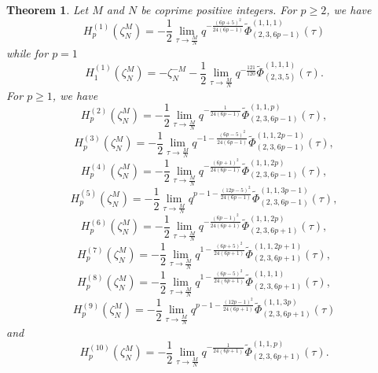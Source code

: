 \documentclass[11pt,reqno]{amsart}
\newtheorem{theorem}{Theorem}[section]
\theoremstyle{definition}
\numberwithin{equation}{section}
\renewcommand{\=}{\;=\;}
\begin{document}
\begin{theorem} \label{main} Let $M$ and $N$ be coprime positive integers. For $p \geq 2$, we have
\begin{equation} \label{main1eq}
H_p^{(1)}(\zeta_N^M) = -\frac{1}{2}  \lim_{\tau \to \frac{M}{N}} q^{-\frac{(6p+5)^2}{24(6p-1)}}\widetilde{\Phi}_{(2,3,6p-1)}^{(1,1,1)} (\tau)
\end{equation}
while for $p=1$
\begin{equation} \label{main11eq}
H_1^{(1)}(\zeta_N^M) = -\zeta_N^{-M} - \frac{1}{2}  \lim_{\tau \to \frac{M}{N}} q^{-\frac{121}{120} }\widetilde{\Phi}_{(2,3,5)}^{(1,1,1)} (\tau).
\end{equation}  
For $p \geq 1$, we have
\begin{equation} \label{main2eq}
H_p^{(2)}(\zeta_N^M) = -\frac{1}{2}  \lim_{\tau \to \frac{M}{N}} q^{-\frac{1}{24(6p-1)}} \widetilde{\Phi}_{(2,3,6p-1)}^{(1,1,p)} (\tau),
\end{equation}
\begin{equation} \label{main3eq}
H_p^{(3)}(\zeta_N^M) = -\frac{1}{2}  \lim_{\tau \to \frac{M}{N}} q^{-1 - \frac{(6p-5)^2}{24(6p-1)}} \widetilde{\Phi}_{(2,3,6p-1)}^{(1,1,2p-1)} (\tau),
\end{equation}
\begin{equation} \label{main4eq}
H_p^{(4)}(\zeta_N^M) = -\frac{1}{2}  \lim_{\tau \to \frac{M}{N}} q^{-\frac{(6p+1)^2}{24(6p-1)}} \widetilde{\Phi}_{(2,3,6p-1)}^{(1,1,2p)} (\tau),
\end{equation}
\begin{equation} \label{main5eq}
H_p^{(5)}(\zeta_N^M) = -\frac{1}{2}  \lim_{\tau \to \frac{M}{N}} q^{p-1 - \frac{(12p-5)^2}{24(6p-1)}} \widetilde{\Phi}_{(2,3,6p-1)}^{(1,1,3p-1)} (\tau),
\end{equation}
\begin{equation} \label{main6}
H_p^{(6)}(\zeta_N^M) = -\frac{1}{2}  \lim_{\tau \to \frac{M}{N}} q^{-\frac{(6p-1)^2}{24(6p+1)}} \widetilde{\Phi}_{(2,3,6p+1)}^{(1,1,2p)} (\tau),
\end{equation}
\begin{equation} \label{main7eq}
H_p^{(7)}(\zeta_N^M) = -\frac{1}{2}  \lim_{\tau \to \frac{M}{N}} q^{1 - \frac{(6p+5)^2}{24(6p+1)}} \widetilde{\Phi}_{(2,3,6p+1)}^{(1,1,2p+1)} (\tau),
\end{equation}
\begin{equation} \label{main8eq}
H_p^{(8)}(\zeta_N^M) = -\frac{1}{2}  \lim_{\tau \to \frac{M}{N}} q^{1 - \frac{(6p-5)^2}{24(6p+1)}} \widetilde{\Phi}_{(2,3,6p+1)}^{(1,1,1)} (\tau),
\end{equation}
\begin{equation} \label{main9eq}
H_p^{(9)}(\zeta_N^M) = -\frac{1}{2}  \lim_{\tau \to \frac{M}{N}} q^{p-1 - \frac{(12p-1)^2}{24(6p+1)}} \widetilde{\Phi}_{(2,3,6p+1)}^{(1,1,3p)} (\tau)
\end{equation}
and
\begin{equation} \label{main10eq}
H_p^{(10)}(\zeta_N^M) =  -\frac{1}{2}  \lim_{\tau \to \frac{M}{N}} q^{-\frac{1}{24(6p+1)}} \widetilde{\Phi}_{(2,3,6p+1)}^{(1,1,p)} (\tau).
\end{equation}
\end{theorem}
\end{document}
